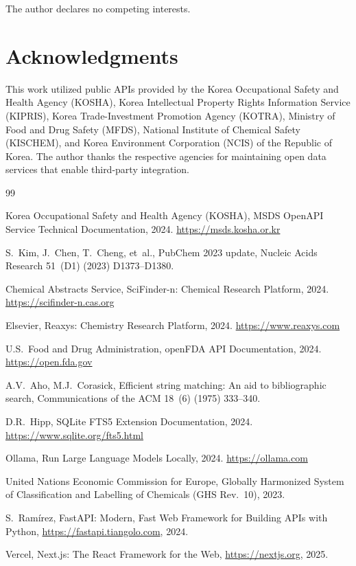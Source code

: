 \documentclass[preprint,12pt]{elsarticle}
\begin{document}
The author declares no competing interests.

\section*{Acknowledgments}

This work utilized public APIs provided by the Korea Occupational Safety and Health Agency (KOSHA), Korea Intellectual Property Rights Information Service (KIPRIS), Korea Trade-Investment Promotion Agency (KOTRA), Ministry of Food and Drug Safety (MFDS), National Institute of Chemical Safety (KISCHEM), and Korea Environment Corporation (NCIS) of the Republic of Korea.
The author thanks the respective agencies for maintaining open data services that enable third-party integration.

\begin{thebibliography}{99}

Korea Occupational Safety and Health Agency (KOSHA),
MSDS OpenAPI Service Technical Documentation, 2024.
\url{https://msds.kosha.or.kr}

S.~Kim, J.~Chen, T.~Cheng, et~al.,
PubChem 2023 update,
Nucleic Acids Research 51~(D1) (2023) D1373--D1380.

Chemical Abstracts Service,
SciFinder-n: Chemical Research Platform, 2024.
\url{https://scifinder-n.cas.org}

Elsevier,
Reaxys: Chemistry Research Platform, 2024.
\url{https://www.reaxys.com}

U.S.\ Food and Drug Administration,
openFDA API Documentation, 2024.
\url{https://open.fda.gov}

A.V.~Aho, M.J.~Corasick,
Efficient string matching: An aid to bibliographic search,
Communications of the ACM 18~(6) (1975) 333--340.

D.R.~Hipp,
SQLite FTS5 Extension Documentation, 2024.
\url{https://www.sqlite.org/fts5.html}

Ollama,
Run Large Language Models Locally, 2024.
\url{https://ollama.com}

United Nations Economic Commission for Europe,
Globally Harmonized System of Classification and Labelling of Chemicals (GHS Rev.~10), 2023.

S.~Ram\'{i}rez,
FastAPI: Modern, Fast Web Framework for Building APIs with Python,
\url{https://fastapi.tiangolo.com}, 2024.

Vercel,
Next.js: The React Framework for the Web,
\url{https://nextjs.org}, 2025.

\end{thebibliography}
\end{document}
